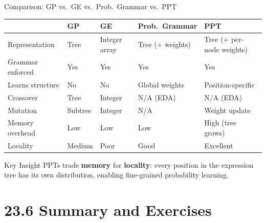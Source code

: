 \documentclass[aspectratio=169,10pt]{beamer}
\begin{document}
\begin{frame}{Comparison: GP vs.\ GE vs.\ Prob.\ Grammar vs.\ PPT}
  \small
  \renewcommand{\arraystretch}{1.35}
  \begin{tabular}{lllll}
    \toprule
    & \textbf{GP} & \textbf{GE} & \textbf{Prob.\ Grammar} & \textbf{PPT} \\
    \midrule
    Representation     & Tree     & Integer array & Tree (+ weights)  & Tree (+ per-node weights) \\
    Grammar enforced   & Yes      & Yes           & Yes               & Yes \\
    Learns structure   & No       & No            & Global weights    & Position-specific \\
    Crossover          & Tree     & Integer       & N/A (EDA)         & N/A (EDA) \\
    Mutation           & Subtree  & Integer       & N/A               & Weight update \\
    Memory overhead    & Low      & Low           & Low               & High (tree grows) \\
    Locality           & Medium   & Poor          & Good              & Excellent \\
    \bottomrule
  \end{tabular}
  \medskip
  \begin{block}{Key Insight}
    PPTs trade \textbf{memory} for \textbf{locality}: every position in the expression
    tree has its own distribution, enabling fine-grained probability learning.
  \end{block}
\end{frame}

\section{23.6 Summary and Exercises}
\end{document}
